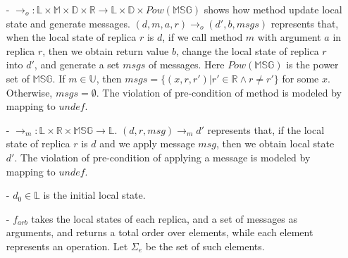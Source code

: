 \begin{itemize}
\setlength{\itemsep}{0.5pt}
\item[-] $\rightarrow_o: \mathbb{L} \times \mathbb{M} \times \mathbb{D} \times \mathbb{R} \rightarrow \mathbb{L} \times \mathbb{D} \times \mathit{Pow}(\mathbb{MSG})$ shows how method update local state and generate messages. $(d,m,a,r) \rightarrow_o (d',b,\mathit{msgs})$ represents that, when the local state of replica $r$ is $d$, if we call method $m$ with argument $a$ in replica $r$, then we obtain return value $b$, change the local state of replica $r$ into $d'$, and generate a set $\mathit{msgs}$ of messages. Here $\mathit{Pow}(\mathbb{MSG})$ is the power set of $\mathbb{MSG}$. If $m \in \mathbb{U}$, then $\mathit{msgs} = \{ (x,r,r') \vert r' \in \mathbb{R} \wedge r \neq r' \}$ for some $x$. Otherwise, $\mathit{msgs} = \emptyset$. {\color {red}The violation of pre-condition of method is modeled by mapping to $\mathit{undef}$.}

\item[-] $\rightarrow_m: \mathbb{L} \times \mathbb{R} \times \mathbb{MSG} \rightarrow \mathbb{L}$. $(d,r,\mathit{msg}) \rightarrow_m d'$ represents that, if the local state of replica $r$ is $d$ and we apply message $\mathit{msg}$, then we obtain local state $d'$. {\color {red}The violation of pre-condition of applying a message is modeled by mapping to $\mathit{undef}$.}

\item[-] $d_0 \in \mathbb{L}$ is the initial local state.

\item[-] $f_{\mathit{arb}}$ takes the local states of each replica, and a set of messages as arguments, and returns a total order over elements, while each element represents an operation. Let $\Sigma_e$ be the set of such elements.



\end{itemize}


